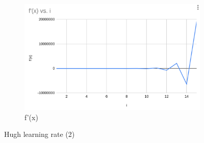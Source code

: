 \documentclass{article}
\begin{document}
\begin{figure}
    \begin{subfigure}{0.3\linewidth}
        \centering
        \includegraphics[width=\linewidth]{f_prime_h.png}
        \caption{f'(x)}
        \label{fig:enter-label}
    \end{subfigure}
    
    \caption{Hugh learning rate (2)}
    \label{fig:enter-label}
\end{figure}
\end{document}
